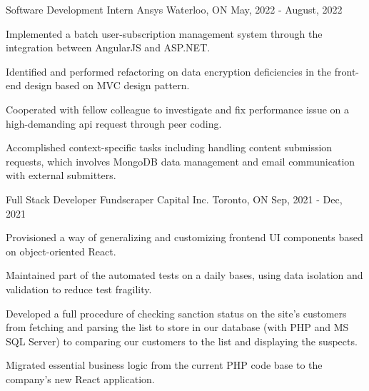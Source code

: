 

\begin{cventries}

  \cventry
	{Software Development Intern} %
	{Ansys} %
	{Waterloo, ON} %
	{May, 2022 - August, 2022} %
	{
		\begin{cvitems} %
			\item {Implemented a batch user-subscription management system through the integration between AngularJS and ASP.NET.}
			\item {Identified and performed refactoring on data encryption deficiencies in the front-end  design based on MVC design pattern.}
			\item {Cooperated with fellow colleague to investigate and fix performance issue on a high-demanding api request through peer coding.}
			\item {Accomplished context-specific tasks including handling content submission requests, which involves MongoDB data management and email communication with external submitters.}
		\end{cvitems}
	}

  \cventry
    {Full Stack Developer} %
    {Fundscraper Capital Inc.} %
    {Toronto, ON} %
    {Sep, 2021 - Dec, 2021} %
    {
		\begin{cvitems} %
			\item {Provisioned a way of generalizing and customizing frontend UI components based on object-oriented React.}
			\item {Maintained part of the automated tests on a daily bases, using data isolation and validation to reduce test fragility.}
			\item {Developed a full procedure of checking sanction status on the site's customers from fetching and parsing the list to store in our database (with PHP and MS SQL Server) to comparing our customers to the list and displaying the suspects.}
			\item {Migrated essential business logic from the current PHP code base to the company's new React application.}
		\end{cvitems}
    }


\end{cventries}
